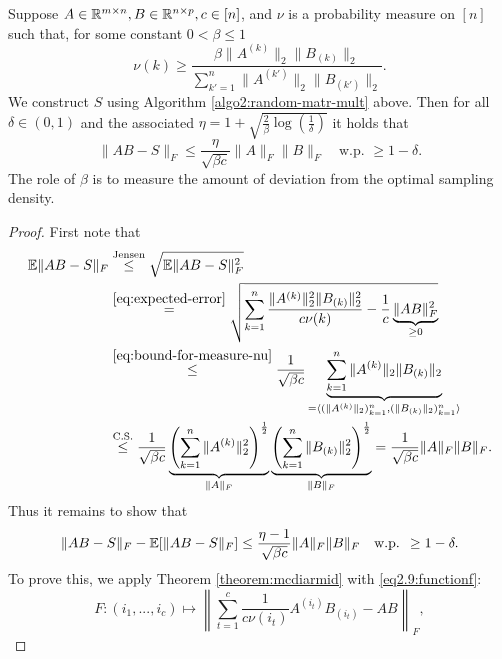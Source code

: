 \begin{theorem}
\begin{mdframed}
Suppose $A\in \mathbb{R}^{m\times n}, B\in \mathbb{R}^{n\times p}, c\in [n]$, and $\nu$ is a probability measure on $[n]$ such that, for some constant $0<\beta\leq 1$
\begin{equation}\label{eq:bound-for-measure-nu}
\nu(k) \geq \frac{\beta \|A^{(k)}\|_2\|B_{(k)}\|_2}{\sum_{k'=1}^n \|A^{(k')}\|_2\|B_{(k')}\|_2 }.
\end{equation}
We construct $S$ using Algorithm \ref{algo2:random-matr-mult} above. Then for all $\delta \in (0,1)$ and the associated $\eta = 1+ \sqrt{\frac{2}{\beta} \log(\frac{1}{\delta})}$ it holds that 
\begin{equation}
\|AB-S\|_F \leq \frac{\eta}{\sqrt{\beta c}} \|A\|_F \|B\|_F \quad	\text{w.p. } \geq 1-\delta.
\end{equation}
The role of $\beta$ is to measure the amount of deviation from the optimal sampling density.
\end{mdframed}
\begin{proof}
First note that 
\begin{equation}
\begin{split}
\mathbb{E} \|AB - S\|_F & \overset{\text{Jensen}}{\leq} \sqrt{\mathbb{E} \|AB-S\|_F^2}  \\
& \overset{\eqref{eq:expected-error}}{=} 
\sqrt{\sum_{k=1}^n \frac{\|A^{(k)}\|_2^2 \|B_{(k)}\|_2^2}{c\nu(k)} - \frac{1}{c} \underbrace{\|AB\|_F^2}_{\geq 0}} \\
& \overset{\eqref{eq:bound-for-measure-nu}}{\leq} \frac{1}{\sqrt{\beta c}} \underbrace{\sum_{k=1}^n \|A^{(k)}\|_2 \|B_{(k)}\|_2}_{= \langle (\|A^{(k)}\|_2)_{k=1}^n, (\|B_{(k)}\|_2)_{k=1}^n \rangle} \\
& \overset{\text{C.S.}}{\leq} \frac{1}{\sqrt{\beta c}} 
\underbrace{\left(
 \sum_{k=1}^n \|A^{(k)}\|_2^2
\right)^\frac{1}{2}}_{\|A\|_F}
\underbrace{\left(
 \sum_{k=1}^n \|B_{(k)}\|_2^2
\right)^\frac{1}{2}}_{\|B\|_F} = \frac{1}{\sqrt{\beta c}} \|A\|_F\|B\|_F.
\end{split}
\end{equation}
Thus it remains to show that
\begin{equation*}
\|AB-S\|_F - \mathbb{E}[\|AB-S\|_F] \leq \frac{\eta -1}{\sqrt{\beta c}} \|A\|_F \|B\|_F\quad \text{w.p. } \geq 1-\delta.
\end{equation*}
To prove this, we apply Theorem \ref{theorem:mcdiarmid} with \eqref{eq2.9:functionf}:
$$F:(i_1,...,i_c) \mapsto \left\|
\sum_{t=1}^c \frac{1}{c\nu(i_t)}A^{(i_t)} B_{(i_t)} - AB \right\|_F,$$

\end{proof}
\end{theorem}
